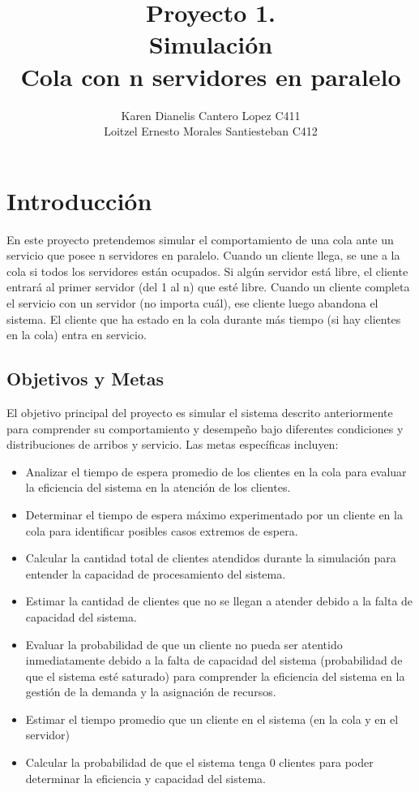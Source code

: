\documentclass[11pt]{article}
\author{Karen Dianelis Cantero Lopez C411 \\ Loitzel Ernesto Morales Santiesteban C412}
\title{Proyecto 1. \\ Simulación \\ Cola con n servidores en paralelo}
\begin{document}
    \maketitle
    \newpage

    \tableofcontents
    \newpage

    \section{Introducción}
    En este proyecto pretendemos simular el comportamiento de una cola ante un servicio que posee n servidores en paralelo. Cuando un cliente llega, se une a la cola si todos los servidores están ocupados. Si algún servidor está libre, el cliente entrará al primer servidor (del 1 al n) que esté libre.
    Cuando un cliente completa el servicio con un servidor (no importa cuál), ese cliente luego abandona el sistema. El cliente que ha estado en la cola durante más tiempo (si hay clientes en la cola) entra en servicio.



    \subsection{Objetivos y Metas}
    El objetivo principal del proyecto es simular el sistema descrito anteriormente para comprender su comportamiento y desempeño bajo diferentes condiciones y distribuciones de arribos y servicio. Las metas específicas incluyen:

    \begin{itemize}
\item Analizar el tiempo de espera promedio de los clientes en la cola para evaluar la eficiencia del sistema en la atención de los clientes.
\item Determinar el tiempo de espera máximo experimentado por un cliente en la cola para identificar posibles casos extremos de espera.
\item Calcular la cantidad total de clientes atendidos durante la simulación para entender la capacidad de procesamiento del sistema.
\item Estimar la cantidad de clientes que no se llegan a atender debido a la falta de capacidad del sistema.
\item Evaluar la probabilidad de que un cliente no pueda ser atentido inmediatamente debido a la falta de capacidad del sistema (probabilidad de que el sistema esté saturado) para comprender la eficiencia del sistema en la gestión de la demanda y la asignación de recursos.
\item Estimar el tiempo promedio que un cliente en el sistema (en la cola y en el servidor)
\item Calcular la probabilidad de que el sistema tenga 0 clientes para poder determinar la eficiencia y capacidad del sistema.
    \end{itemize}
\end{document}
